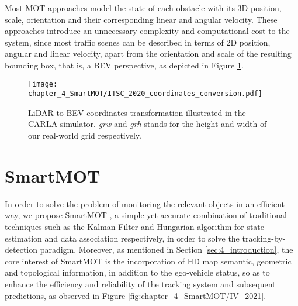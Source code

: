 Most \ac{MOT} approaches \cite{weng20203d, chiu2021probabilistic} model the state of each obstacle with its 3D position, scale, orientation and their corresponding linear and angular velocity. These approaches introduce an unnecessary complexity and computational cost to the system, since most traffic scenes can be described in terms of 2D position, angular and linear velocity, apart from the orientation and scale of the resulting bounding box, that is, a \ac{BEV} perspective, as depicted in Figure \ref{fig:chapter_4_SmartMOT/ITSC_2020_coordinates_conversion}. 

\begin{figure}[h]
	\centering
	\texttt{[image: chapter\_4\_SmartMOT/ITSC\_2020\_coordinates\_conversion.pdf]}
	\caption{LiDAR to BEV coordinates transformation illustrated in the CARLA simulator. \textit{grw} and \textit{grh} stands for the height and width of our real-world grid respectively.}
	\label{fig:chapter_4_SmartMOT/ITSC_2020_coordinates_conversion}
\end{figure}

\section{SmartMOT}
\label{sec:4_smartmot}

In order to solve the problem of monitoring the relevant objects in an efficient way, we propose SmartMOT \cite{gomez2021smartmot}, a simple-yet-accurate combination of traditional techniques such as the Kalman Filter \cite{kalman1960new} and Hungarian algorithm \cite{kuhn1955hungarian} for state estimation and data association respectively, in order to solve the tracking-by-detection paradigm. Moreover, as mentioned in Section \ref{sec:4_introduction}, the core interest of SmartMOT is the incorporation of HD map semantic, geometric and topological information, in addition to the ego-vehicle status, so as to enhance the efficiency and reliability of the tracking system and subsequent predictions, as observed in Figure \ref{fig:chapter_4_SmartMOT/IV_2021}. 

